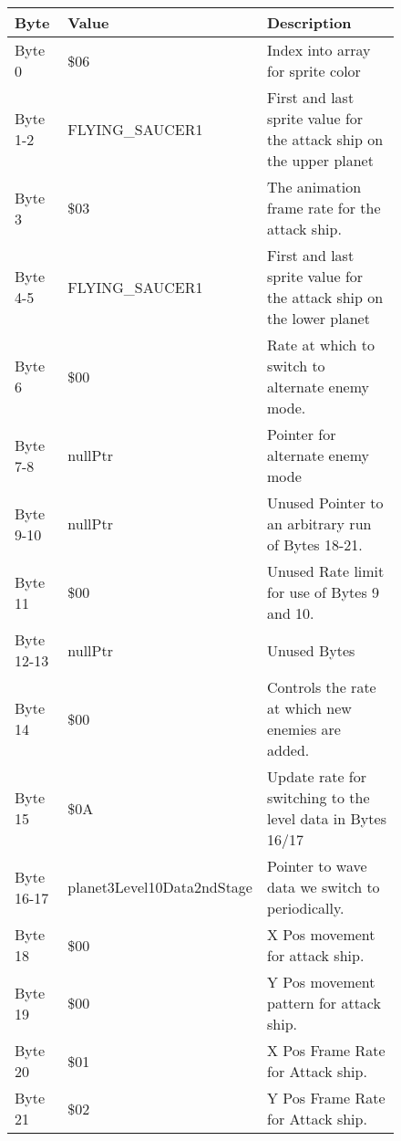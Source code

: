 \begin{figure}[H]
{\begin{adjustbox}{width=12cm}
\begin{tabular}{lll}
\toprule
 Byte       & Value                      & Description                                                         \\
\midrule
 Byte 0     & \$06                        & Index into array for sprite color                                   \\
 Byte 1-2   & FLYING\_SAUCER1             & First and last sprite value for the attack ship on the upper planet \\
 Byte 3     & \$03                        & The animation frame rate for the attack ship.                       \\
 Byte 4-5   & FLYING\_SAUCER1             & First and last sprite value for the attack ship on the lower planet \\
 Byte 6     & \$00                        & Rate at which to switch to alternate enemy mode.                    \\
 Byte 7-8   & nullPtr                    & Pointer for alternate enemy mode                                    \\
 Byte 9-10  & nullPtr                    & Unused Pointer to an arbitrary run of Bytes 18-21.                  \\
 Byte 11    & \$00                        & Unused Rate limit for use of Bytes 9 and 10.                        \\
 Byte 12-13 & nullPtr                    & Unused Bytes                                                        \\
 Byte 14    & \$00                        & Controls the rate at which new enemies are added.                   \\
 Byte 15    & \$0A                        & Update rate for switching to the level data in Bytes 16/17          \\
 Byte 16-17 & planet3Level10Data2ndStage & Pointer to wave data we switch to periodically.                     \\
 Byte 18    & \$00                        & X Pos movement for attack ship.                                     \\
 Byte 19    & \$00                        & Y Pos movement pattern for attack ship.                             \\
 Byte 20    & \$01                        & X Pos Frame Rate for Attack ship.                                   \\
 Byte 21    & \$02                        & Y Pos Frame Rate for Attack ship.                                   \\

\end{tabular}
\end{adjustbox}}
\end{figure}
